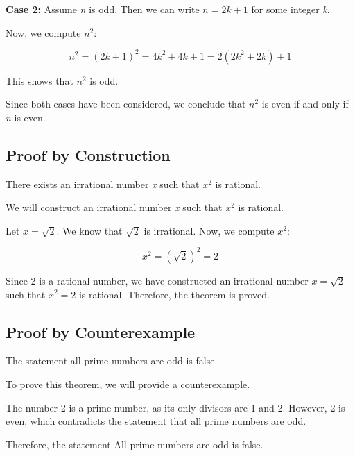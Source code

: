 \textbf{Case 2:} Assume \emph{n} is odd. Then we can write \( n = 2k + 1 \) for some integer \emph{k}.
\vspace{\baselineskip}

Now, we compute \( n^2 \):

\[
	n^2 = {(2k + 1)}^2 = 4k^2 + 4k + 1 = 2(2k^2 + 2k) + 1
\]

This shows that \( n^2 \) is odd.
\vspace{\baselineskip}

Since both cases have been considered, we conclude that \( n^2 \) is even if and only if \emph{n} is even.

\QED

\subsection{Proof by Construction}

There exists an irrational number \emph{x} such that \( x^2 \) is rational.
\vspace{\baselineskip}

We will construct an irrational number \emph{x} such that \( x^2 \) is rational.
\vspace{\baselineskip}

Let \( x = \sqrt{2} \). We know that \( \sqrt{2} \) is irrational. Now, we compute \( x^2 \):
	
\[
	x^2 = (\sqrt{2})^2 = 2
\]
	
Since 2 is a rational number, we have constructed an irrational number \( x = \sqrt{2} \) such 
that \( x^2 = 2 \) is rational. Therefore, the theorem is proved.

\QED

\subsection{Proof by Counterexample}

The statement all prime numbers are odd is false.
\vspace{\baselineskip}

To prove this theorem, we will provide a counterexample.
\vspace{\baselineskip}

The number 2 is a prime number, as its only divisors are 1 and 2. However, 2 is 
even, which contradicts the statement that all prime numbers are odd.
\vspace{\baselineskip}

Therefore, the statement All prime numbers are odd is false.
\QED

